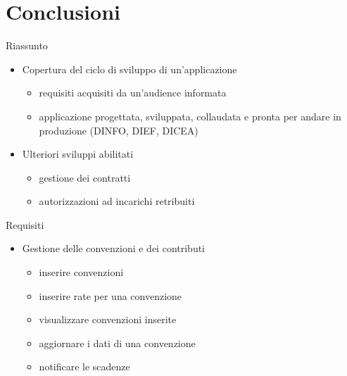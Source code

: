 \section{Conclusioni}
\begin{frame}{Riassunto}
\begin{itemize}
\item Copertura del ciclo di sviluppo di un'applicazione
	\vspace{0.6em}
	\begin{itemize}
	\item requisiti acquisiti da un'audience informata
	\vspace{0.4em}
	\item applicazione progettata, sviluppata, collaudata e\newline
	pronta per andare in produzione (DINFO, DIEF, DICEA)
	\end{itemize}
\vspace{1em}
\item Ulteriori sviluppi abilitati
\vspace{0.6em}
\begin{itemize}
\item gestione dei contratti
\vspace{0.4em}
\item autorizzazioni ad incarichi retribuiti
\end{itemize}
\end{itemize}

\end{frame}
\begin{frame}{Requisiti}
\begin{itemize}
\item Gestione delle convenzioni e dei contributi
\vspace{0.8em}
	\begin{itemize}
	\item inserire convenzioni
	\item inserire rate per una convenzione
	\item visualizzare convenzioni inserite
	\item aggiornare i dati di una convenzione
	\item notificare le scadenze
	\end{itemize}
\end{itemize}
\end{frame}

